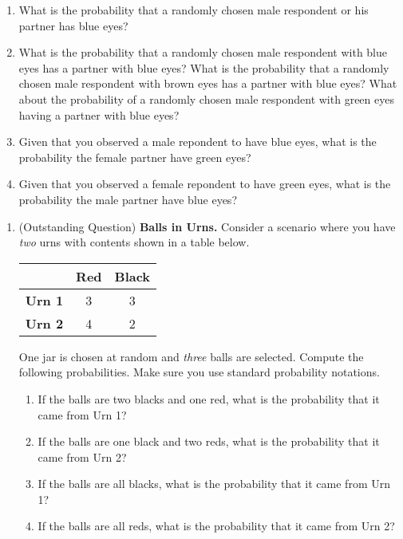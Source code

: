 \documentclass[
]{article}
\providecommand{\tightlist}{%
  \setlength{\itemsep}{0pt}\setlength{\parskip}{0pt}}
\begin{document}
\begin{enumerate}
  \begin{enumerate}
  \def\labelenumii{\alph{enumii}.}
  \tightlist
  \item
    What is the probability that a randomly chosen male respondent or his partner has blue eyes?
  \item
    What is the probability that a randomly chosen male respondent with blue eyes has a partner with blue eyes? What is the probability that a randomly chosen male respondent with brown eyes has a partner with blue eyes? What about the probability of a randomly chosen male respondent with green eyes having a partner with blue eyes?
  \item
    Given that you observed a male repondent to have blue eyes, what is the probability the female partner have green eyes?
  \item
    Given that you observed a female repondent to have green eyes, what is the probability the male partner have blue eyes?
  \end{enumerate}
\end{enumerate}

\newpage

\begin{enumerate}
\def\labelenumi{\arabic{enumi}.}
\setcounter{enumi}{2}
\item
  (Outstanding Question) \textbf{Balls in Urns.} Consider a scenario where you have \emph{two} urns with contents shown in a table below.

  \begin{longtable}[]{@{}ccc@{}}
  \toprule()
  & \textbf{Red} & \textbf{Black} \\
  \midrule()
  \endhead
  \textbf{Urn 1} & 3 & 3 \\
  \textbf{Urn 2} & 4 & 2 \\
  \bottomrule()
  \end{longtable}

  One jar is chosen at random and \emph{three} balls are selected. Compute the following probabilities. Make sure you use standard probability notations.

  \begin{enumerate}
  \def\labelenumii{\alph{enumii}.}
  \tightlist
  \item
    If the balls are two blacks and one red, what is the probability that it came from Urn 1?
  \item
    If the balls are one black and two reds, what is the probability that it came from Urn 2?
  \item
    If the balls are all blacks, what is the probability that it came from Urn 1?
  \item
    If the balls are all reds, what is the probability that it came from Urn 2?
  \end{enumerate}
\end{enumerate}
\end{document}
